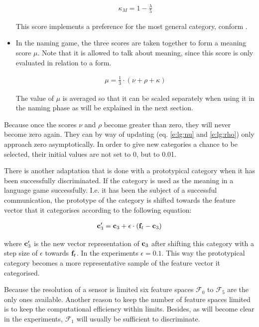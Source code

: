 \begin{itemize}

\begin{eqnarray}
\displaystyle
\kappa_M=1 - \frac{\lambda}{5}
\label{e:lg:kappa}
\end{eqnarray}

\noindent
This score implements a preference for the most general category, conform \citep{steels:1996b}. 

\item In the naming game, the three scores are taken together to form a meaning score $\mu$. Note that it is allowed to talk about meaning, since this score is only evaluated in relation to a form.

\begin{eqnarray}
\displaystyle
\mu=\frac{1}{3}\cdot (\nu+\rho+\kappa)
\end{eqnarray}


\noindent
The value of $\mu$ is averaged so that it can be scaled separately when using it in the naming phase as will be explained in the next section.
\end{itemize}


Because once the scores $\nu$ and $\rho$ become greater than zero, they will never become zero again. They can by way of updating (eq. \ref{e:lg:nu} and \ref{e:lg:rho}) only approach zero asymptotically. In order to give new categories a chance to be selected, their initial values are not set to 0, but to 0.01.

There is another adaptation that is done with a prototypical category when it has been successfully discriminated. If the category is used as the meaning in a language game successfully. I.e. it has been the subject of a successful communication, the prototype of the category is shifted towards the feature vector that it categorises according to the following equation:

\begin{eqnarray}
{\bf c}_3' = {\bf c}_3 + \epsilon \cdot ({\bf f}_t - {\bf c}_3)
\end{eqnarray}


where ${\bf c}_3'$ is the new vector representation of  ${\bf c}_3$ after shifting this category with a step size of $\epsilon$ towards ${\bf f}_t$. In the experiments $\epsilon=0.1$. This way the prototypical category becomes a more representative sample of the feature vector it categorised.

Because the resolution of a sensor is limited six feature spaces ${\mathcal F}_0$ to ${\mathcal F}_5$ are the only ones available. Another reason to keep the number of feature spaces limited is to keep the computational efficiency within limits. Besides, as will become clear in the experiments, ${\mathcal F}_1$ will usually be sufficient to discriminate.


